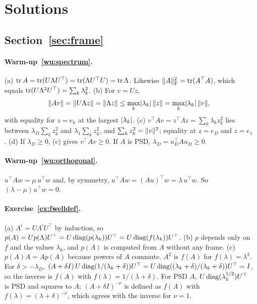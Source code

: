 \clearpage
\section{Solutions}\label{app:solutions}

\newcommand{\sol}[2]{\paragraph{#1~\ref{#2}.}}

\subsection*{Section~\ref{sec:frame}}

\sol{Warm-up}{wu:spectrum}
(a) $\operatorname{tr} A=\operatorname{tr}(U\Lambda U^\top)=\operatorname{tr}(\Lambda U^\top U)=\operatorname{tr}\Lambda$. Likewise $\lVert A\rVert_{\mathrm{F}}^2=\operatorname{tr}(A^\top A)$, which
equals $\operatorname{tr}(U\Lambda^2U^\top)=\sum_k\lambda_k^2$.
\newline (b) For $v=Uz$,
\[\lVert Av\rVert=\lVert U\Lambda z\rVert=\lVert\Lambda z\rVert\le\max_k\lvert\lambda_k\rvert\,\lVert z\rVert=\max_k\lvert\lambda_k\rvert\,\lVert v\rVert,\]
with equality for $z=e_k$ at the largest $\lvert\lambda_k\rvert$.
\newline (c) $v^\top Av=z^\top\Lambda z=\sum_k\lambda_kz_k^2$ lies between $\lambda_D\sum_kz_k^2$ and $\lambda_1\sum_kz_k^2$,
and $\sum_kz_k^2=\lVert v\rVert^2$; equality at $z=e_D$ and $z=e_1$.
\newline (d) If $\lambda_D\ge0$, (c) gives $v^\top Av\ge0$. If $A$ is PSD, $\lambda_D=u_D^\top Au_D\ge0$.

\sol{Warm-up}{wu:orthogonal}
$u^\top Aw=\mu\,u^\top w$ and, by symmetry, $u^\top Aw=(Au)^\top w=\lambda\,u^\top w$. So $(\lambda-\mu)u^\top w=0$.

\sol{Exercise}{ex:fwelldef}
(a) $A^i=U\Lambda^iU^\top$ by induction, so $p(A)=Up(\Lambda)U^\top=U\operatorname{diag}(p(\lambda_k))U^\top=U\operatorname{diag}(f(\lambda_k))U^\top$.
\newline (b) $p$ depends only on $f$ and the values $\lambda_k$, and $p(A)$ is computed from $A$ without any frame.
\newline (c) $p(A)A=Ap(A)$ because powers of $A$ commute. $A^2$ is $f(A)$ for $f(\lambda)=\lambda^2$. For $\delta>-\lambda_D$,
$(A+\delta I)\,U\operatorname{diag}(1/(\lambda_k+\delta))U^\top=U\operatorname{diag}((\lambda_k+\delta)/(\lambda_k+\delta))U^\top=I$, so the inverse is
$f(A)$ with $f(\lambda)=1/(\lambda+\delta)$. For PSD $A$, $U\operatorname{diag}(\lambda_k^{1/2})U^\top$ is PSD and squares to $A$;
$(A+\delta I)^{-\nu}$ is defined as $f(A)$ with $f(\lambda)=(\lambda+\delta)^{-\nu}$, which agrees with the inverse
for $\nu=1$.

